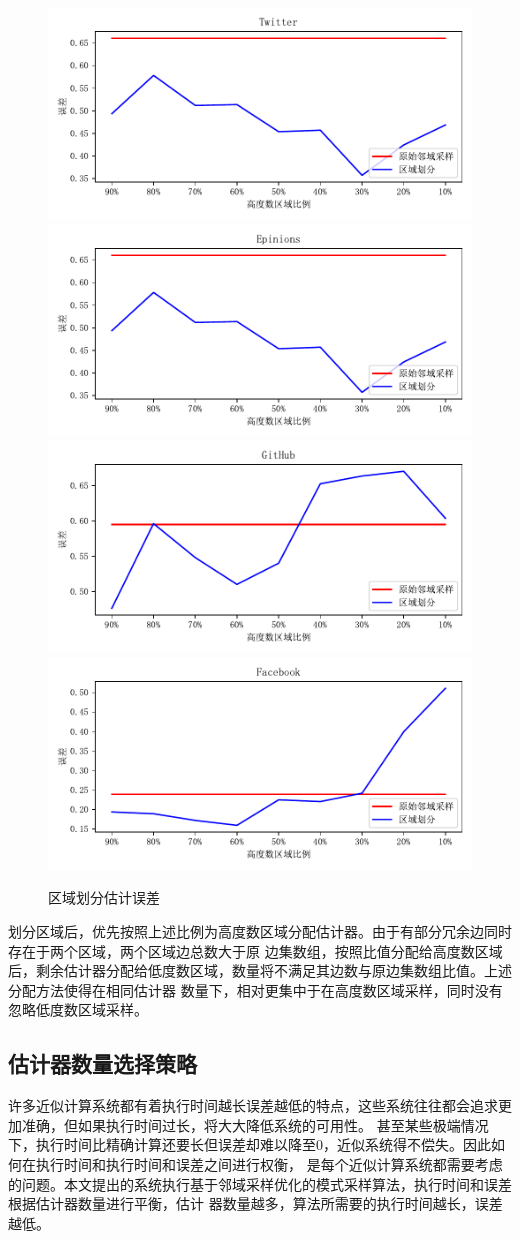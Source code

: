 \documentclass[master]{thesis-uestc}
\begin{document}
\begin{figure}[h]
    \includegraphics[width=0.5\linewidth]{pic/partition/Twitter.pdf}%
    \includegraphics[width=0.5\linewidth]{pic/partition/Epinions.pdf}\\
    \includegraphics[width=0.5\linewidth]{pic/partition/GitHub.pdf}%
    \includegraphics[width=0.5\linewidth]{pic/partition/Facebook.pdf}
    \caption{区域划分估计误差}
    \label{fig:partition}
\end{figure}

    划分区域后，优先按照上述比例为高度数区域分配估计器。由于有部分冗余边同时存在于两个区域，两个区域边总数大于原
边集数组，按照比值分配给高度数区域后，剩余估计器分配给低度数区域，数量将不满足其边数与原边集数组比值。上述分配方法使得在相同估计器
数量下，相对更集中于在高度数区域采样，同时没有忽略低度数区域采样。
    
\subsection{估计器数量选择策略}
\label{subsec:elp}
    许多近似计算系统都有着执行时间越长误差越低的特点，这些系统往往都会追求更加准确，但如果执行时间过长，将大大降低系统的可用性。
甚至某些极端情况下，执行时间比精确计算还要长但误差却难以降至0，近似系统得不偿失。因此如何在执行时间和执行时间和误差之间进行权衡，
是每个近似计算系统都需要考虑的问题。本文提出的系统执行基于邻域采样优化的模式采样算法，执行时间和误差根据估计器数量进行平衡，估计
器数量越多，算法所需要的执行时间越长，误差越低。
\end{document}
